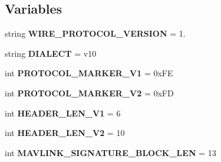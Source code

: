 \subsection*{Variables}
\begin{DoxyCompactItemize}
\item 
\mbox{\label{namespacepymavlink_1_1dialects_1_1v10_a4b0b4f6bcbf949daca71869bed26deaa}} 
string {\bfseries W\+I\+R\+E\+\_\+\+P\+R\+O\+T\+O\+C\+O\+L\+\_\+\+V\+E\+R\+S\+I\+ON} = \textquotesingle{}1.\textquotesingle{}
\item 
\mbox{\label{namespacepymavlink_1_1dialects_1_1v10_a1ad6eae3d05f586701539f94a4f0afe4}} 
string {\bfseries D\+I\+A\+L\+E\+CT} = \textquotesingle{}v10\textquotesingle{}
\item 
\mbox{\label{namespacepymavlink_1_1dialects_1_1v10_af4a852db3a6b94a3f321eecd89cb7400}} 
int {\bfseries P\+R\+O\+T\+O\+C\+O\+L\+\_\+\+M\+A\+R\+K\+E\+R\+\_\+\+V1} = 0x\+FE
\item 
\mbox{\label{namespacepymavlink_1_1dialects_1_1v10_af650844f8d473ae7bedfa3aadcbe3a42}} 
int {\bfseries P\+R\+O\+T\+O\+C\+O\+L\+\_\+\+M\+A\+R\+K\+E\+R\+\_\+\+V2} = 0x\+FD
\item 
\mbox{\label{namespacepymavlink_1_1dialects_1_1v10_ac29f023f05a538528abf15e329101dda}} 
int {\bfseries H\+E\+A\+D\+E\+R\+\_\+\+L\+E\+N\+\_\+\+V1} = 6
\item 
\mbox{\label{namespacepymavlink_1_1dialects_1_1v10_a9062bebde60716f552b0da1d3ccfcb32}} 
int {\bfseries H\+E\+A\+D\+E\+R\+\_\+\+L\+E\+N\+\_\+\+V2} = 10
\item 
\mbox{\label{namespacepymavlink_1_1dialects_1_1v10_a78fac83bc495f9c3529c43da0aeba61f}} 
int {\bfseries M\+A\+V\+L\+I\+N\+K\+\_\+\+S\+I\+G\+N\+A\+T\+U\+R\+E\+\_\+\+B\+L\+O\+C\+K\+\_\+\+L\+EN} = 13
\item 
\mbox{\label{namespacepymavlink_1_1dialects_1_1v10_a9288701c3417dc176995f954735fa401}} 

\end{DoxyCompactItemize}
